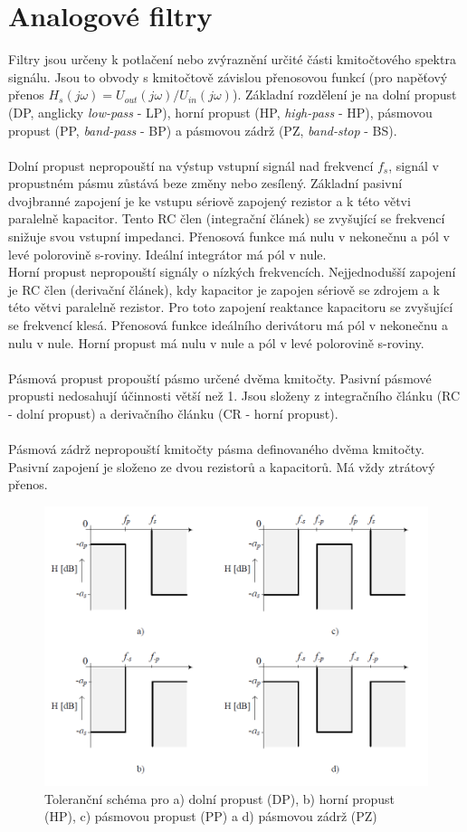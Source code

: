 \documentclass[twoside]{article}
\begin{document}
\section{Analogové filtry}
Filtry jsou určeny k potlačení nebo zvýraznění určité části kmitočtového spektra signálu. Jsou to obvody s kmitočtově závislou přenosovou funkcí (pro napěťový přenos $H_s(j \omega) = U_{out}(j \omega)/U_{in}(j \omega)$). Základní rozdělení je na dolní propust (DP, anglicky \textit{low-pass} - LP), horní propust (HP, \textit{high-pass} - HP), pásmovou propust (PP, \textit{band-pass} - BP) a pásmovou zádrž (PZ, \textit{band-stop} - BS). \\
\\
Dolní propust nepropouští na výstup vstupní signál nad frekvencí $f_s$, signál v propustném pásmu zůstává beze změny nebo zesílený. Základní pasivní dvojbranné zapojení je ke vstupu sériově zapojený rezistor a k této větvi paralelně kapacitor. Tento RC člen (integrační článek) se zvyšující se frekvencí snižuje svou vstupní impedanci. Přenosová funkce má nulu v nekonečnu a pól v levé polorovině s-roviny. Ideální integrátor má pól v nule. \\
Horní propust nepropouští signály o nízkých frekvencích. Nejjednodušší zapojení je RC člen (derivační článek), kdy kapacitor je zapojen sériově se zdrojem a k této větvi paralelně rezistor. Pro toto zapojení reaktance kapacitoru se zvyšující se frekvencí klesá. Přenosová funkce ideálního derivátoru má pól v nekonečnu a nulu v nule. Horní propust má nulu v nule a pól v levé polorovině s-roviny.\\
\\
Pásmová propust propouští pásmo určené dvěma kmitočty. Pasivní pásmové propusti nedosahují účinnosti větší než 1. Jsou složeny z integračního článku (RC - dolní propust) a derivačního článku (CR - horní propust).\\
\\
Pásmová zádrž nepropouští kmitočty pásma definovaného dvěma kmitočty. Pasivní zapojení je složeno ze dvou rezistorů a kapacitorů. Má vždy ztrátový přenos.
\begin{figure}[H]
\centering
\includegraphics[scale=0.55]{tolerancnischemata.png}
\caption{Toleranční schéma pro a) dolní propust (DP), b) horní propust (HP), c) pásmovou propust (PP) a d) pásmovou zádrž (PZ)\cite{1}}
\end{figure}
\end{document}
